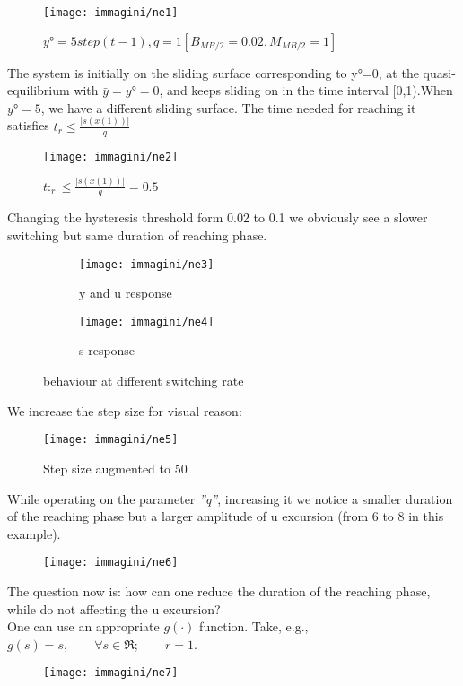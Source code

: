 \begin{figure}[H]
	\centering
	\texttt{[image: immagini/ne1]}
	\caption{$y°=5step(t-1), q=1[B_{MB/2}=0.02,M_{MB/2}=1]$}
	\label{fig:ne1}
\end{figure}
The system is initially on the sliding surface corresponding to y°=0, at the quasi-equilibrium with $\bar{y}=y°=0$, and keeps sliding on in the time interval [0,1).When $y°=5$, we have a different sliding surface. The time needed for reaching it satisfies $t_r\le\frac{|s(x(1))|}{q}$
\begin{figure}[H]
	\centering
	\texttt{[image: immagini/ne2]}
	\caption{$t:_r\le\frac{|s(x(1))|}{q}=0.5$}
	\label{fig:ne2}
\end{figure}
Changing the hysteresis threshold form 0.02 to 0.1 we obviously see a slower switching but same duration of reaching phase.

\begin{figure}[H]
	\centering
	\begin{subfigure}[b]{0.3\textwidth}
		\centering
		\texttt{[image: immagini/ne3]}
		\caption{y and u response}
		\label{fig:ne3}
	\end{subfigure}
	\hfill
	\begin{subfigure}[b]{0.3\textwidth}
		\centering
		\texttt{[image: immagini/ne4]}
		\caption{s response}
		\label{fig:ne4}
	\end{subfigure}
	\hfill
	\label{fig:ne34}
	\caption{behaviour at different switching rate}
\end{figure}
We increase the step size for visual reason:
\begin{figure}[H]
	\centering
	\texttt{[image: immagini/ne5]}
	\caption{Step size augmented to 50}
	\label{fig:ne5}
\end{figure}

While operating on the parameter \emph{''q''}, increasing it we notice a smaller duration of the reaching phase but a larger amplitude of u excursion (from 6 to 8 in this example).
\begin{figure}[H]
	\centering
	\texttt{[image: immagini/ne6]}
	\caption{}
	\label{fig:ne6}
\end{figure}
The question now is: how can one reduce the duration of the reaching phase, while do not affecting the u excursion? \\One can use an appropriate $g(\cdot)$ function. Take, e.g., $g(s)=s,\qquad \forall s\in \Re; \qquad r=1$.
\begin{figure}[H]
	\centering
	\texttt{[image: immagini/ne7]}
	\caption{}
	\label{fig:ne7}
\end{figure}
